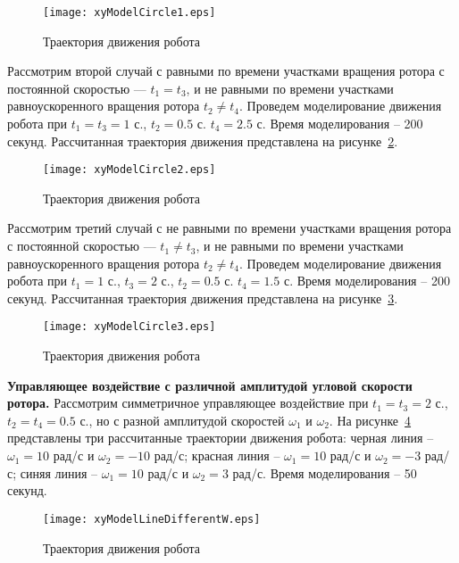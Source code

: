\begin{figure}[!ht]
	\centering
	\texttt{[image: xyModelCircle1.eps]}
	\caption{Траектория движения робота}
	\label{xyModelCircle1}
\end{figure}

Рассмотрим второй случай с равными по времени участками вращения ротора с постоянной скоростью --- $t_1 = t_3$, и не равными по времени участками равноускоренного вращения ротора $t_2 \neq t_4$. Проведем моделирование движения робота при $t_1=t_3=1$ с., $t_2=0.5$ с. $t_4 = 2.5$ с. Время моделирования -- 200 секунд. Рассчитанная траектория движения представлена на рисунке~\ref{xyModelCircle2}.

\begin{figure}[!ht]
	\centering
	\texttt{[image: xyModelCircle2.eps]}
	\caption{Траектория движения робота}
	\label{xyModelCircle2}
\end{figure}

Рассмотрим третий случай с не равными по времени участками вращения ротора с постоянной скоростью --- $t_1 \neq t_3$, и не равными по времени участками равноускоренного вращения ротора $t_2 \neq t_4$. Проведем моделирование движения робота при $t_1=1$ с., $t_3=2$ с., $t_2=0.5$ с. $t_4 = 1.5$ с. Время моделирования -- 200 секунд. Рассчитанная траектория движения представлена на рисунке~\ref{xyModelCircle3}.

\begin{figure}[!ht]
	\centering
	\texttt{[image: xyModelCircle3.eps]}
	\caption{Траектория движения робота}
	\label{xyModelCircle3}
\end{figure}

\textbf{Управляющее воздействие с различной амплитудой угловой скорости ротора.} Рассмотрим симметричное управляющее воздействие при $t_1=t_3=2$ с., $t_2=t_4 = 0.5$ с., но с разной амплитудой скоростей $\omega_1$ и $\omega_2$.  На рисунке~\ref{xyModelLineDifferentW} представлены три рассчитанные траектории движения робота: черная линия -- $\omega_1=10$ рад/с и $\omega_2=-10$ рад/с; красная линия -- $\omega_1=10$ рад/с и $\omega_2=-3$ рад/с; синяя линия -- $\omega_1=10$ рад/с и $\omega_2=3$ рад/с. Время моделирования -- 50 секунд.

\begin{figure}[!ht]
	\centering
	\texttt{[image: xyModelLineDifferentW.eps]}
	\caption{Траектория движения робота}
	\label{xyModelLineDifferentW}
\end{figure}

